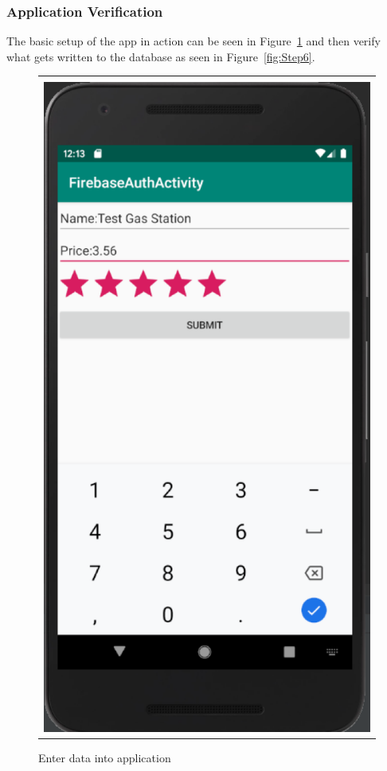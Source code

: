 \documentclass[conference]{IEEEtran}
\begin{document}
\subsubsection{Application Verification}
The basic setup of the app in action can be seen in Figure~\ref{fig:Step5} and then verify what gets written to the database as seen in Figure~\ref{fig:Step6}. 
\begin{figure}[h] %
\begin{tabular}{| p{}|}
\hline
\\
\begin{center} \includegraphics[scale=.35]{../graphics/Step5.png} \end{center}\\
\hline
\end{tabular}	
	\caption{Enter data into application}
	\label{fig:Step5}
\end{figure} 
\end{document}
